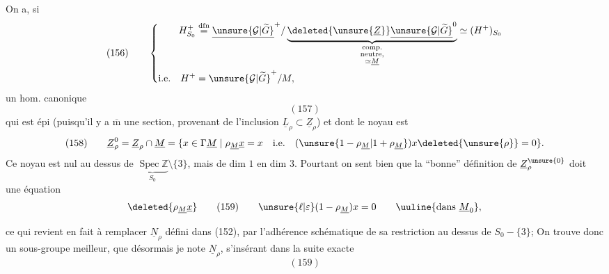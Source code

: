 On a, si
\[
(156)\qquad\left\{
\begin{aligned}
H^+_{S_0}&\overset{\mathrm{dfn}}{=}
\underline{\unsure{\mathcal G|\widetilde G}}^{+}/
\underbrace{\deleted{\unsure{\underline Z}}\underline{\unsure{\mathcal G|\widetilde G}}^{0}}_{\substack{\text{comp.}\\\text{neutre,}\\\simeq\underline M}}
\simeq(H^+)_{S_0}\\
\text{i.e.}\quad H^+&=\unsure{\mathcal G|\widetilde G}^{+}/M,
\end{aligned}\right.
\]
un hom. canonique
\[
(157)
\]
qui est épi (puisqu'il y a $\overline{\mathrm m}$ une section, provenant de l'inclusion $\underline L_\rho\subset\underline Z_\rho$) et dont le noyau est
\[
(158)\qquad
\underline Z_\rho^0=\underline Z_\rho\cap\underline M
=\{x\in\Gamma\underline M\mid\rho_{\underline M}\underline x=x\quad\text{i.e.}\quad(\unsure{1-\rho_{\underline M}|1+\rho_{\underline M}})x\deleted{\unsure{\rho}}=0\}.
\]
Ce noyau est nul au dessus de $\underbrace{\operatorname{Spec}\mathbb Z}_{S_0}\setminus\{3\}$,
mais de dim $1$ en dim $3$. Pourtant on sent bien que la ``bonne'' définition de $\underline Z_\rho^{\unsure{0}}$  doit  une équation
\[
\deleted{\rho_{\underline M}\underline x}\qquad
(159)\qquad \unsure{\ell|\varepsilon}(1-\rho_{\underline M})x=0\qquad\uuline{\text{dans }\underline M_0},
\]

ce qui revient en fait  à remplacer $\underline N_\rho$ défini dans (152), par l'adhérence schématique de sa restriction au dessus de $S_0-\{3\}$; On trouve donc un sous-groupe meilleur, que désormais je note $\underline N_\rho$, s'insérant dans la suite exacte
\[
(159)
\]

